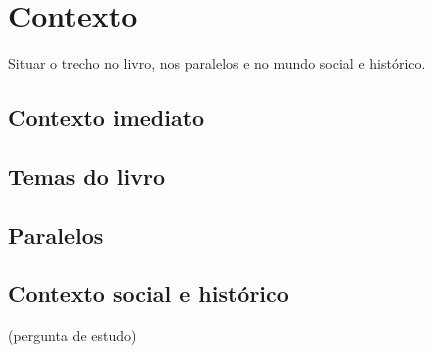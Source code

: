 \chapter{Contexto}\label{cap:contexto}

\begin{objetivo}
Situar o trecho no livro, nos paralelos e no mundo social e histórico.
\end{objetivo}

\section{Contexto imediato}

\section{Temas do livro}

\section{Paralelos}

\section{Contexto social e histórico}

\begin{pergunta}
(pergunta de estudo)
\end{pergunta}
